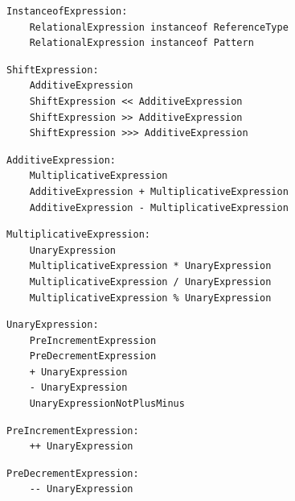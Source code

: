 \noindent\textbf{\texttt{}}\par
\begin{lstlisting}
InstanceofExpression:
    RelationalExpression instanceof ReferenceType
    RelationalExpression instanceof Pattern
\end{lstlisting}

\noindent\textbf{\texttt{}}\par
\begin{lstlisting}
ShiftExpression:
    AdditiveExpression
    ShiftExpression << AdditiveExpression
    ShiftExpression >> AdditiveExpression
    ShiftExpression >>> AdditiveExpression
\end{lstlisting}

\noindent\textbf{\texttt{}}\par
\begin{lstlisting}
AdditiveExpression:
    MultiplicativeExpression
    AdditiveExpression + MultiplicativeExpression
    AdditiveExpression - MultiplicativeExpression
\end{lstlisting}

\noindent\textbf{\texttt{}}\par
\begin{lstlisting}
MultiplicativeExpression:
    UnaryExpression
    MultiplicativeExpression * UnaryExpression
    MultiplicativeExpression / UnaryExpression
    MultiplicativeExpression % UnaryExpression
\end{lstlisting}

\noindent\textbf{\texttt{}}\par
\begin{lstlisting}
UnaryExpression:
    PreIncrementExpression
    PreDecrementExpression
    + UnaryExpression
    - UnaryExpression
    UnaryExpressionNotPlusMinus
\end{lstlisting}

\noindent\textbf{\texttt{}}\par
\begin{lstlisting}
PreIncrementExpression:
    ++ UnaryExpression
\end{lstlisting}

\noindent\textbf{\texttt{}}\par
\begin{lstlisting}
PreDecrementExpression:
    -- UnaryExpression
\end{lstlisting}

